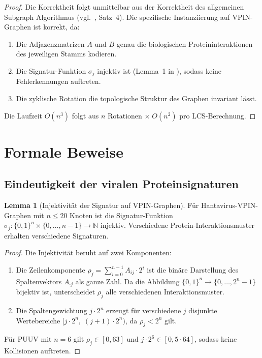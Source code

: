 ﻿\documentclass[a4paper,12pt]{article}
\theoremstyle{definition}
\newtheorem{lemma}{Lemma}
\begin{document}
\begin{proof}
    Die Korrektheit folgt unmittelbar aus der Korrektheit des allgemeinen
    Subgraph Algorithmus (vgl.\ \cite{Epp2026}, Satz~4). Die spezifische
    Instanziierung auf VPIN-Graphen ist korrekt, da:
    \begin{enumerate}
        \item Die Adjazenzmatrizen $A$ und $B$ genau die biologischen
              Proteininteraktionen des jeweiligen Stamms kodieren.
        \item Die Signatur-Funktion $\sigma_j$ injektiv ist (Lemma~1
              in \cite{Epp2026}), sodass keine Fehlerkennungen auftreten.
        \item Die zyklische Rotation die topologische Struktur des
              Graphen invariant l\"asst.
    \end{enumerate}
    Die Laufzeit $O(n^3)$ folgt aus $n$ Rotationen $\times\; O(n^2)$ pro
    LCS-Berechnung. \qedhere
\end{proof}

\section{Formale Beweise}
\label{sec:beweise}

\subsection{Eindeutigkeit der viralen Proteinsignaturen}

\begin{lemma}[Injektivit\"at der Signatur auf VPIN-Graphen]
    \label{lem:injektivitaet}
    F\"ur Hantavirus-VPIN-Graphen mit $n \leq 20$ Knoten ist die
    Signatur-Funktion $\sigma_j: \{0,1\}^n \times \{0,\ldots,n-1\} \to \mathbb{N}$
    injektiv. Verschiedene Protein-Interaktionsmuster erhalten verschiedene Signaturen.
\end{lemma}

\begin{proof}
    Die Injektivit\"at beruht auf zwei Komponenten:
    \begin{enumerate}
        \item Die Zeilenkomponente $\rho_j = \sum_{i=0}^{n-1} A_{ij} \cdot 2^i$ ist
              die bin\"are Darstellung des Spaltenvektors $A_{\cdot j}$ als ganze Zahl.
              Da die Abbildung $\{0,1\}^n \to \{0, \ldots, 2^n - 1\}$ bijektiv ist,
              unterscheidet $\rho_j$ alle verschiedenen Interaktionsmuster.
        \item Die Spaltengewichtung $j \cdot 2^n$ erzeugt f\"ur verschiedene $j$
              disjunkte Wertebereiche $[j \cdot 2^n,\; (j+1) \cdot 2^n)$, da
              $\rho_j < 2^n$ gilt.
    \end{enumerate}
    F\"ur PUUV mit $n=6$ gilt $\rho_j \in [0, 63]$ und $j \cdot 2^6 \in [0, 5 \cdot 64]$,
    sodass keine Kollisionen auftreten. \qedhere
\end{proof}
\end{document}
